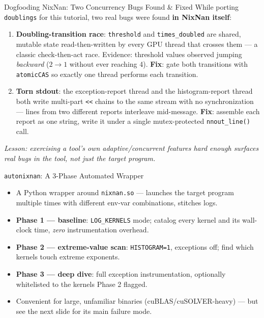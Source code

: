 \documentclass[aspectratio=169,11pt]{beamer}
\begin{document}
\begin{frame}{Dogfooding NixNan: Two Concurrency Bugs Found \& Fixed}
\label{sl:dogfood}
While porting \texttt{doublings} for this tutorial, two real bugs were found
\textbf{in NixNan itself}:
\begin{enumerate}
  \item \textbf{Doubling-transition race}: \texttt{threshold} and
    \texttt{times\_doubled} are shared, mutable state read-then-written by
    every GPU thread that crosses them --- a classic check-then-act race.
    Evidence: threshold values observed jumping \emph{backward} ($2\to1$
    without ever reaching 4). \textbf{Fix}: gate both transitions with
    \texttt{atomicCAS} so exactly one thread performs each transition.
  \item \textbf{Torn stdout}: the exception-report thread and the
    histogram-report thread both write multi-part \texttt{<<} chains to the
    same stream with no synchronization --- lines from two different reports
    interleave mid-message. \textbf{Fix}: assemble each report as one string,
    write it under a single mutex-protected \texttt{nnout\_line()} call.
\end{enumerate}
\textit{Lesson: exercising a tool's own adaptive/concurrent features hard
enough surfaces real bugs in the tool, not just the target program.}
\end{frame}

\begin{frame}{\texttt{autonixnan}: A 3-Phase Automated Wrapper}
\begin{itemize}
  \item A Python wrapper around \texttt{nixnan.so} --- launches the target
    program multiple times with different env-var combinations, stitches logs.
  \item \textbf{Phase 1 --- baseline}: \texttt{LOG\_KERNELS} mode; catalog
    every kernel and its wall-clock time, \emph{zero} instrumentation overhead.
  \item \textbf{Phase 2 --- extreme-value scan}: \texttt{HISTOGRAM=1},
    exceptions off; find which kernels touch extreme exponents.
  \item \textbf{Phase 3 --- deep dive}: full exception instrumentation,
    optionally whitelisted to the kernels Phase 2 flagged.
  \item Convenient for large, unfamiliar binaries (cuBLAS/cuSOLVER-heavy) ---
    but see the next slide for its main failure mode.
\end{itemize}
\end{frame}
\end{document}
